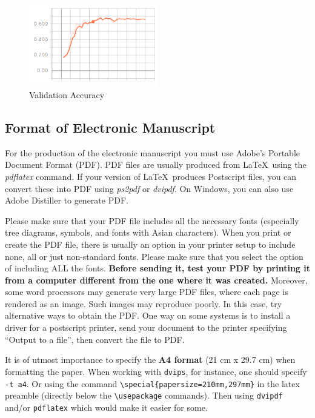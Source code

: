 \documentclass[11pt,a4paper]{article}
\begin{document}
\begin{figure}[h]
\caption{Validation Accuracy}
\centering
\includegraphics[width=0.5\textwidth]{vaccuracy.png}
\end{figure}


\subsection{Format of Electronic Manuscript}
\label{sect:pdf}

For the production of the electronic manuscript you must use Adobe's
Portable Document Format (PDF). PDF files are usually produced from
\LaTeX\ using the \textit{pdflatex} command. If your version of
\LaTeX\ produces Postscript files, you can convert these into PDF
using \textit{ps2pdf} or \textit{dvipdf}. On Windows, you can also use
Adobe Distiller to generate PDF.

Please make sure that your PDF file includes all the necessary fonts
(especially tree diagrams, symbols, and fonts with Asian
characters). When you print or create the PDF file, there is usually
an option in your printer setup to include none, all or just
non-standard fonts.  Please make sure that you select the option of
including ALL the fonts. \textbf{Before sending it, test your PDF by
  printing it from a computer different from the one where it was
  created.} Moreover, some word processors may generate very large PDF
files, where each page is rendered as an image. Such images may
reproduce poorly. In this case, try alternative ways to obtain the
PDF. One way on some systems is to install a driver for a postscript
printer, send your document to the printer specifying ``Output to a
file'', then convert the file to PDF.

It is of utmost importance to specify the \textbf{A4 format} (21 cm
x 29.7 cm) when formatting the paper. When working with
{\tt dvips}, for instance, one should specify {\tt -t a4}.
Or using the command \verb|\special{papersize=210mm,297mm}| in the latex
preamble (directly below the \verb|\usepackage| commands). Then using 
{\tt dvipdf} and/or {\tt pdflatex} which would make it easier for some.
\end{document}
